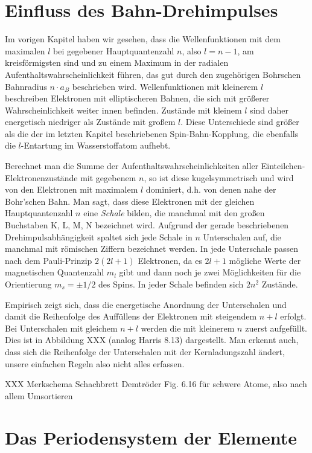 \section{Einfluss des Bahn-Drehimpulses}

Im vorigen Kapitel haben wir gesehen, dass die Wellenfunktionen mit dem maximalen $l$ bei gegebener Hauptquantenzahl $n$, also $l=n-1$, am kreisförmigsten sind und zu einem Maximum in der radialen Aufenthaltswahrscheinlichkeit führen, das gut durch den zugehörigen Bohrschen Bahnradius $n \cdot a_B$ beschrieben wird. Wellenfunktionen mit kleinerem $l$ beschreiben Elektronen mit elliptischeren Bahnen, die sich mit größerer Wahrscheinlichkeit weiter innen befinden. Zustände mit kleinem $l$ sind daher energetisch niedriger als Zustände mit großem $l$. Diese Unterschiede sind größer als die der im letzten Kapitel beschriebenen Spin-Bahn-Kopplung, die ebenfalls die $l$-Entartung im Wasserstoffatom aufhebt.

Berechnet man die Summe der Aufenthaltswahrscheinlichkeiten aller Einteilchen-Elektronenzustände mit gegebenem $n$, so ist diese kugelsymmetrisch und wird von den Elektronen mit maximalem $l$ dominiert, d.h. von denen nahe  der Bohr'schen Bahn. 
Man sagt, dass diese Elektronen mit der gleichen Hauptquantenzahl $n$ eine \emph{Schale} bilden, die manchmal mit den großen Buchstaben K, L, M, N bezeichnet wird.  Aufgrund der gerade beschriebenen Drehimpulsabhängigkeit spaltet sich jede Schale in $n$ Unterschalen auf, die manchmal mit römischen Ziffern bezeichnet werden. In jede Unterschale passen nach dem Pauli-Prinzip $2 (2l +1)$ Elektronen, da es $2l +1$ mögliche Werte der magnetischen Quantenzahl $m_l$ gibt und dann noch je zwei Möglichkeiten für die Orientierung $m_s = \pm 1/2$ des Spins. In jeder Schale befinden sich $2n^2$ Zustände.

Empirisch zeigt sich, dass die energetische Anordnung der Unterschalen und damit die Reihenfolge des Auffüllens der Elektronen mit steigendem $n+l$ erfolgt. Bei Unterschalen mit gleichem $n+l$ werden die mit kleinerem $n$ zuerst aufgefüllt. Dies ist in Abbildung XXX (analog Harris 8.13) dargestellt. Man erkennt auch, dass sich die Reihenfolge der Unterschalen mit der Kernladungszahl ändert, unsere einfachen Regeln also nicht alles erfassen.

XXX Merkschema Schachbrett Demtröder Fig. 6.16 für schwere Atome, also nach allem Umsortieren


\section{Das Periodensystem der Elemente}

